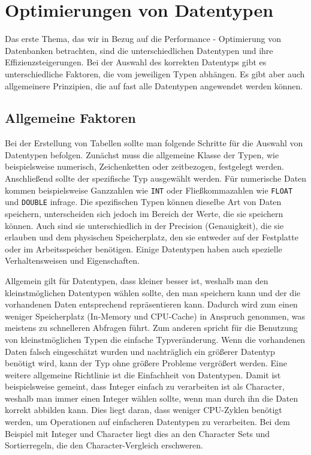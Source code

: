 
\chapter{Optimierungen von Datentypen}

Das erste Thema, das wir in Bezug auf die Performance - Optimierung von Datenbanken betrachten, sind die unterschiedlichen Datentypen und ihre Effizienzsteigerungen.
Bei der Auswahl des korrekten Datentyps gibt es unterschiedliche Faktoren, die vom jeweiligen Typen abhängen.
Es gibt aber auch allgemeinere Prinzipien, die auf fast alle Datentypen angewendet werden können.

\section{Allgemeine Faktoren}

Bei der Erstellung von Tabellen sollte man folgende Schritte für die Auswahl von Datentypen befolgen.
Zunächst muss die allgemeine Klasse der Typen, wie beispielsweise numerisch, Zeichenketten oder zeitbezogen, festgelegt werden.
Anschließend sollte der spezifische Typ ausgewählt werden.
Für numerische Daten kommen beispielsweise Ganzzahlen wie \texttt{INT} oder Fließkommazahlen wie \texttt{FLOAT} und \texttt{DOUBLE} infrage.
Die spezifischen Typen können dieselbe Art von Daten speichern, unterscheiden sich jedoch im Bereich der Werte, die sie speichern können.
Auch sind sie unterschiedlich in der Precision (Genauigkeit), die sie erlauben und dem physischen Speicherplatz, den sie entweder auf der Festplatte oder im Arbeitsspeicher benötigen.
Einige Datentypen haben auch spezielle Verhaltensweisen und Eigenschaften.

Allgemein gilt für Datentypen, dass kleiner besser ist, weshalb man den kleinstmöglichen Datentypen wählen sollte, den man speichern kann und der die vorhandenen Daten entsprechend repräsentieren kann.
Dadurch wird zum einen weniger Speicherplatz (In-Memory und CPU-Cache) in Anspruch genommen, was meistens zu schnelleren Abfragen führt.
Zum anderen spricht für die Benutzung von kleinstmöglichen Typen die einfache Typveränderung.
Wenn die vorhandenen Daten falsch eingeschätzt wurden und nachträglich ein größerer Datentyp benötigt wird, kann der Typ ohne größere Probleme vergrößert werden.
Eine weitere allgemeine Richtlinie ist die Einfachheit von Datentypen.
Damit ist beispielsweise gemeint, dass Integer einfach zu verarbeiten ist als Character, weshalb man immer einen Integer wählen sollte, wenn man durch ihn die Daten korrekt abbilden kann.
Dies liegt daran, dass weniger CPU-Zyklen benötigt werden, um Operationen auf einfacheren Datentypen zu verarbeiten.
Bei dem Beispiel mit Integer und Character liegt dies an den Character Sets und Sortierregeln, die den Character-Vergleich erschweren.


